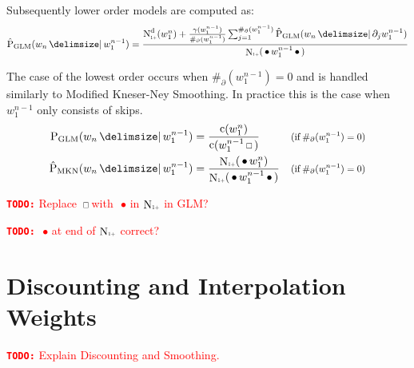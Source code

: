 \documentclass[m,bachelor,binding]{WeSTthesis}
\newcommand*{\Scale}[2][4]{\scalebox{#1}{$#2$}}%
\newcommand{\Condition}[1]{\Scale[0.85]{(\text{if} \: #1)}}
\DeclareMathOperator{\Count}{c}
\DeclareMathOperator{\ContCount}{N}
\newcommand{\ContCountIp}  {\ContCount_{\Scale[0.5]{1+}}}
\newcommand{\Skp}{\ensuremath{\,\Scale[0.7]{\square}\,}}
\newcommand{\WSkp}{\ensuremath{\,\bullet\,}}
\newcommand{\todo}[1]{\textcolor{red}{{\footnotesize\textbf{\texttt{TODO:}}} #1}}
\begin{document}
Subsequently lower order models are computed as:
\begin{equation}
  \label{eq:glm-low}
  \ProbGLM*{w_n}{w_1^{n-1}} =
    \frac{\DiscountedCount*(w_1^n) + \frac{\gamma(w_1^{n-1})}{\#_\partial(w_1^{n-1})}
                                     \sum_{j=1}^{\#_\partial(w_1^{n-1})} \ProbGLM*{w_n}{\partial_j w_1^{n-1}}}
         {\ContCountIp(\WSkp w_1^{n-1} \WSkp)}
\end{equation}

The case of the lowest order occurs when $\#_\partial(w_1^{n-1}) = 0$ and is
handled similarly to Modified Kneser-Ney Smoothing.
In practice this is the case when $w_1^{n-1}$ only consists of skips.
\begin{subequations}
  \label{eq:glm-lowest}
  \begin{align}
    \ProbGLM {w_n}{w_1^{n-1}} &= \frac{\Count(w_1^n)}{\Count(w_1^{n-1} \Skp)}
      & \Condition{\#_\partial(w_1^{n-1}) = 0} \\
    \ProbMKN*{w_n}{w_1^{n-1}} &= \frac{\ContCountIp(\WSkp w_1^n)}{\ContCountIp(\WSkp w_1^{n-1} \WSkp)}
      & \Condition{\#_\partial(w_1^{n-1}) = 0}
  \end{align}
\end{subequations}

\todo{Replace \Skp with \WSkp in $\ContCountIp$ in GLM?}

\todo{\WSkp at end of $\ContCountIp$ correct?}

\section{Discounting and Interpolation Weights}
\label{sec:discounts-interpolation-weights}

\todo{Explain Discounting and Smoothing.}
\end{document}
